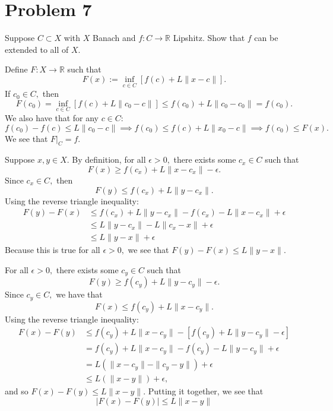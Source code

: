 \documentclass[11pt]{article}
\newcommand{\bbR}{\mathbb{R}}
\begin{document}
\section*{Problem 7}
\begin{problem}
    Suppose $C\subset X$ with $X$ Banach and $f: C\to \bbR$ Lipshitz. Show that $f$ can be extended to all of $X.$
\end{problem}
\begin{solution}
    Define $F: X\to \bbR$ such that 
    \[F(x):= \inf_{c\in C}\left[f(c) + L\|x-c\|\right].\] If $c_0\in C,$ then 
    \[F(c_0) = \inf_{c\in C}\left[f(c) + L\|c_0-c\|\right] \leq f(c_0) + L\|c_0-c_0\| = f(c_0).\]
    We also have that for any $c\in C:$
    \[f(c_0) - f(c) \leq L\|c_0 - c\| \implies f(c_0) \leq f(c) + L\|x_0 - c\| \implies f(c_0) \leq F(x).\]
    We see that $F|_C= f.$ 
    

    Suppose $x,y \in X.$ By definition, for all $\epsilon>0,$ there exists some $c_x \in C$ such that 
    \[F(x) \geq f(c_x) + L\|x - c_x\| - \epsilon.\] Since $c_x \in C,$ then  
    \[F(y) \leq f(c_x) + L\|y-c_x\|.\]
    Using the reverse triangle inequality:
    \begin{align*}
        F(y) - F(x) &\leq f(c_x) +L\|y - c_x\| - f(c_x) - L\|x - c_x\| + \epsilon\\
        &\leq L\|y - c_x\| - L\|c_x - x\| + \epsilon\\
        &\leq L\|y - x\| + \epsilon
    \end{align*}
    Because this is true for all $\epsilon>0,$ we see that $F(y) - F(x) \leq L\|y - x\|.$ 

    For all $\epsilon>0,$ there exists some $c_y \in C$ such that 
    \[F(y) \geq f(c_y) + L\|y - c_y\| - \epsilon.\] Since $c_y \in C,$ we have that 
    \[F(x) \leq f(c_y) + L\|x- c_y\|.\] Using the reverse triangle inequality:
    \begin{align*}
        F(x) - F(y) &\leq f(c_y) + L\|x- c_y\| - [f(c_y) + L\|y - c_y\| - \epsilon]\\
        &= f(c_y) + L\|x- c_y\| - f(c_y) - L\|y - c_y\| + \epsilon\\
        &= L(\|x - c_y\| - \|c_y - y\|) + \epsilon\\
        &\leq L(\|x - y\|) + \epsilon,
    \end{align*}
    and so $F(x) - F(y) \leq L\|x - y\|.$ Putting it together, we see that 
    \[|F(x) - F(y)| \leq L\|x-y\|\]
\end{solution}
\end{document}
